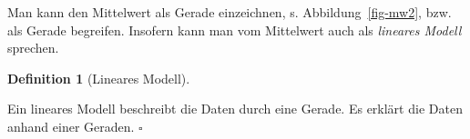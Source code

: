 \documentclass[
  letterpaper,
  twoside,
  open=any]{scrbook}
\theoremstyle{definition}
\theoremstyle{definition}
\theoremstyle{definition}
\newtheorem{definition}{Definition}[chapter]
\theoremstyle{remark}
\begin{document}
Man kann den Mittelwert als Gerade einzeichnen, s.
Abbildung~\ref{fig-mw2}, bzw. als Gerade begreifen. Insofern kann man
vom Mittelwert auch als \emph{lineares Modell} sprechen.

\begin{definition}[Lineares
Modell]\protect\hypertarget{def-lm}{}\label{def-lm}

Ein lineares Modell beschreibt die Daten durch eine Gerade. Es erklärt
die Daten anhand einer Geraden. \(\square\)

\end{definition}

\begin{figure}

\begin{minipage}{0.50\linewidth}



\end{minipage}%
%
\begin{minipage}{0.50\linewidth}

\end{minipage}
\end{figure}
\end{document}
